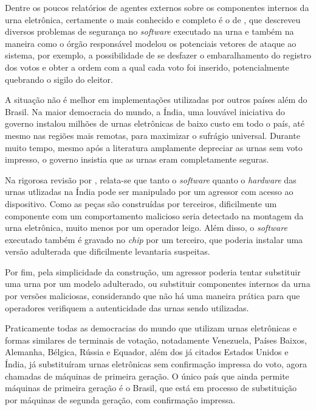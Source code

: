 Dentre os poucos relatórios de agentes externos sobre os componentes internos
da urna eletrônica, certamente o mais conhecido e completo é o de
\textcite{aranha2012vulnerabilidades}, que descreveu diversos problemas de
segurança no \textit{software} executado na urna e também na maneira como o
órgão responsável modelou os potenciais vetores de ataque ao sistema, por
exemplo, a possibilidade de se desfazer o embaralhamento do registro dos votos
e obter a ordem com a qual cada voto foi inserido, potencialmente quebrando o
sigilo do eleitor.

A situação não é melhor em implementações utilizadas por outros países além do
Brasil. Na maior democracia do mundo, a Índia, uma louvável iniciativa do
governo instalou milhões de urnas eletrônicas de baixo custo em todo o país,
até mesmo nas regiões mais remotas, para maximizar o sufrágio universal.
Durante muito tempo, mesmo após a literatura amplamente depreciar as urnas sem
voto impresso, o governo insistia que as urnas eram completamente seguras.

Na rigorosa revisão por \textcite{wolchok2010security}, relata-se que tanto o
\textit{software} quanto o \textit{hardware} das urnas utlizadas na Índia pode
ser manipulado por um agressor com acesso ao dispositivo. Como as peças são
construídas por terceiros, dificilmente um componente com um comportamento
malicioso seria detectado na montagem da urna eletrônica, muito menos por um
operador leigo. Além disso, o \textit{software} executado também é gravado no
\textit{chip} por um terceiro, que poderia instalar uma versão adulterada que
dificilmente levantaria suspeitas.

Por fim, pela simplicidade da construção, um agressor poderia tentar substituir
uma urna por um modelo adulterado, ou substituir componentes internos da urna
por versões maliciosas, considerando que não há uma maneira prática para que
operadores verifiquem a autenticidade das urnas sendo utilizadas.

Praticamente todas as democracias do mundo que utilizam urnas eletrônicas
 e formas similares de
terminais de votação, notadamente Venezuela, Países Baixos, Alemanha, Bélgica,
Rússia e Equador, além dos já citados Estados Unidos e Índia, já substituíram
urnas eletrônicas sem confirmação impressa do voto, agora chamadas de máquinas
de primeira geração. O único país que ainda permite máquinas de primeira
geração é o Brasil, que está em processo de substituição por máquinas de
segunda geração, com confirmação impressa.
